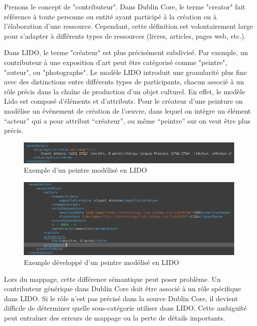 Prenons le concept de "contributeur". Dans Dublin Core, le terme "creator" fait référence à toute personne ou entité ayant participé à la création ou à l'élaboration d'une ressource. Cependant, cette définition est volontairement large pour s'adapter à différents types de ressources (livres, articles, pages web, etc.).\newline

Dans LIDO, le terme "créateur" est plus précisément subdivisé. Par exemple, un contributeur à une exposition d'art peut être catégorisé comme "peintre", "auteur", ou "photographe". Le modèle LIDO introduit une granularité plus fine avec des distinctions entre différents types de participants, chacun associé à un rôle précis dans la chaîne de production d’un objet culturel. En effet, le modèle Lido est composé d'éléments et d’attributs. Pour le créateur d’une peinture on modélise un événement de création de l'œuvre, dans lequel on intègre un élément “acteur” qui a pour attribut “créateur”, ou même “peintre” sur on veut être plus précis. 

\begin{figure}[h!]
	\centerline{\includegraphics[width=\textwidth]{medias/figure_actor_2.png}}
	\caption{Exemple d'un peintre modélisé en LIDO}
\end{figure}
\begin{figure}[h!]
	\centerline{\includegraphics[width=\textwidth]{medias/figure_actor.png}}
	\caption{Exemple développé d'un peintre modélisé en LIDO}
\end{figure}

Lors du mappage, cette différence sémantique peut poser problème. Un contributeur générique dans Dublin Core doit être associé à un rôle spécifique dans LIDO. Si le rôle n'est pas précisé dans la source Dublin Core, il devient difficile de déterminer quelle sous-catégorie utiliser dans LIDO. Cette ambiguïté peut entraîner des erreurs de mappage ou la perte de détails importants.\newline

